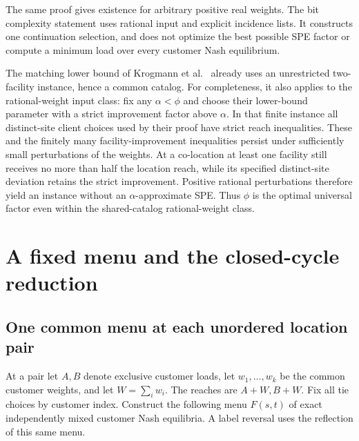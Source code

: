 \documentclass[11pt,a4paper]{article}
\begin{document}
The same proof gives existence for arbitrary positive real weights. The bit
complexity statement uses rational input and explicit incidence lists. It
constructs one continuation selection, and does not optimize the best possible
SPE factor or compute a minimum load over every customer Nash equilibrium.

The matching lower bound of Krogmann et al.~\cite[Theorem~5]{krogmann2024}
already uses an unrestricted two-facility instance, hence a common catalog.
For completeness, it also applies to the rational-weight input class: fix
any $\alpha<\phi$ and choose their lower-bound parameter with a strict
improvement factor above $\alpha$. In that finite instance all distinct-site
client choices used by their proof have strict reach inequalities. These
and the finitely many facility-improvement inequalities persist under
sufficiently small perturbations of the weights. At a co-location at least
one facility still receives no more than half the location reach, while its
specified distinct-site deviation retains the strict improvement. Positive
rational perturbations therefore yield an instance without an
$\alpha$-approximate SPE. Thus $\phi$ is the optimal universal factor even
within the shared-catalog rational-weight class.

\hypertarget{exact-criterion-and-the-closed-ring-reduction}{%
\section{A fixed menu and the closed-cycle reduction}\label{exact-criterion-and-the-closed-ring-reduction}}

\subsection{One common menu at each unordered location pair}\label{sec:menu}
At a pair let $A,B$ denote exclusive customer loads, let
$w_1,\ldots,w_k$ be the common customer weights, and let $W=\sum_iw_i$.
The reaches are $A+W,B+W$. Fix all tie choices by customer index.
Construct the following menu $F(s,t)$ of exact independently mixed customer
Nash equilibria. A label reversal uses the reflection of this same menu.
\end{document}
